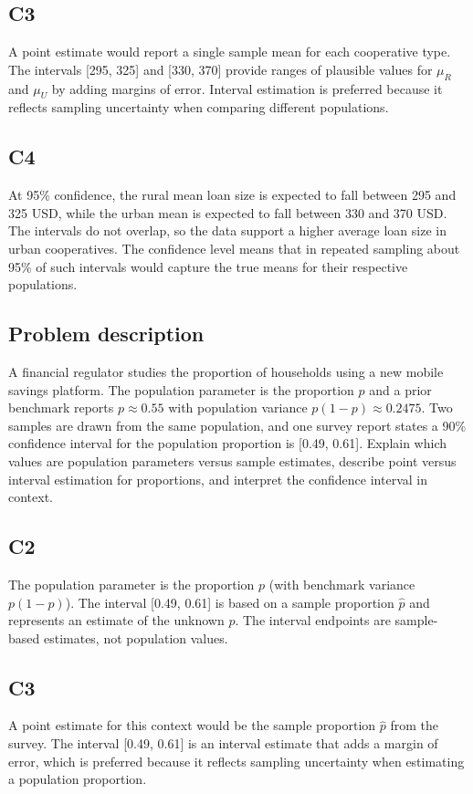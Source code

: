 \begin{ExamProblems}
		\subsection*{C3}
		A point estimate would report a single sample mean for each cooperative type. The intervals [295, 325] and [330, 370] provide ranges of plausible values for $\mu_R$ and $\mu_U$ by adding margins of error. Interval estimation is preferred because it reflects sampling uncertainty when comparing different populations.

		\subsection*{C4}
		At 95\% confidence, the rural mean loan size is expected to fall between 295 and 325 USD, while the urban mean is expected to fall between 330 and 370 USD. The intervals do not overlap, so the data support a higher average loan size in urban cooperatives. The confidence level means that in repeated sampling about 95\% of such intervals would capture the true means for their respective populations.

		\newpage
		\item
		\subsection*{Problem description}
		A financial regulator studies the proportion of households using a new mobile savings platform.
		The population parameter is the proportion $p$ and a prior benchmark reports $p \approx 0.55$ with population variance $p(1-p) \approx 0.2475$.
		Two samples are drawn from the same population, and one survey report states a 90\% confidence interval for the population proportion is [0.49, 0.61].
		Explain which values are population parameters versus sample estimates, describe point versus interval estimation for proportions, and interpret the confidence interval in context.

		\subsection*{C2}
		The population parameter is the proportion $p$ (with benchmark variance $p(1-p)$). The interval [0.49, 0.61] is based on a sample proportion $\hat{p}$ and represents an estimate of the unknown $p$. The interval endpoints are sample-based estimates, not population values.

		\subsection*{C3}
		A point estimate for this context would be the sample proportion $\hat{p}$ from the survey. The interval [0.49, 0.61] is an interval estimate that adds a margin of error, which is preferred because it reflects sampling uncertainty when estimating a population proportion.


\end{ExamProblems}
